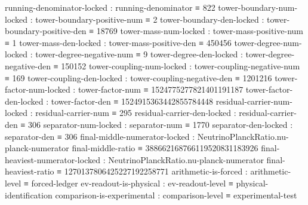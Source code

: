 \documentclass[11pt,a4paper]{book}
\begin{document}
\begin{code}
    running-denominator-locked   : running-denominator ≡ 822
    tower-boundary-num-locked    : tower-boundary-positive-num ≡ 2
    tower-boundary-den-locked    : tower-boundary-positive-den ≡ 18769
    tower-mass-num-locked        : tower-mass-positive-num ≡ 1
    tower-mass-den-locked        : tower-mass-positive-den ≡ 450456
    tower-degree-num-locked      : tower-degree-negative-num ≡ 9
    tower-degree-den-locked      : tower-degree-negative-den ≡ 150152
    tower-coupling-num-locked    : tower-coupling-negative-num ≡ 169
    tower-coupling-den-locked    : tower-coupling-negative-den ≡ 1201216
    tower-factor-num-locked      :
      tower-factor-num ≡ 1524775277821401191187
    tower-factor-den-locked      :
      tower-factor-den ≡ 1524915363442855784448
    residual-carrier-num-locked  : residual-carrier-num ≡ 295
    residual-carrier-den-locked  : residual-carrier-den ≡ 306
    separator-num-locked         : separator-num ≡ 1770
    separator-den-locked         : separator-den ≡ 306
    final-middle-numerator-locked :
      NeutrinoPlanckRatio.nu-planck-numerator final-middle-ratio
        ≡ 388662168766119520831183926
    final-heaviest-numerator-locked :
      NeutrinoPlanckRatio.nu-planck-numerator final-heaviest-ratio
        ≡ 1270137806425227192258771
    arithmetic-is-forced        : arithmetic-level ≡ forced-ledger
    ev-readout-is-physical      : ev-readout-level ≡ physical-identification
    comparison-is-experimental  : comparison-level ≡ experimental-test


\end{code}
\end{document}
